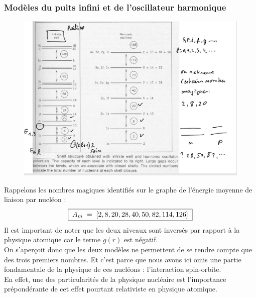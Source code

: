 \subsubsection{Modèles du puits infini et de l'oscillateur harmonique}
\begin{figure}[H]
    \centering
    \includegraphics[scale = 0.6]{Images4/infinite_well_and_harmonic_oscillator.PNG}
\end{figure}
Rappelons les nombres magiques identifiés sur le graphe de l'énergie moyenne de liaison par nucléon :
\begin{equation*}
    \boxed{
    \;A_m \; = \; [2,8,20,28,40,50,82,114,126]\;
    }
\end{equation*}
Il est important de noter que les deux niveaux sont inversés par rapport à la physique atomique car le terme $g(r)$ est négatif.\\
On s'aperçoit donc que les deux modèles ne permettent de se rendre compte que des trois premiers nombres. Et c'est parce que nous avons ici omis une partie fondamentale de la physique de ces nucléons : l'interaction spin-orbite.\\
En effet, une des particularités de la physique nucléaire est l'importance prépondérante de cet effet pourtant relativiste en physique atomique.
